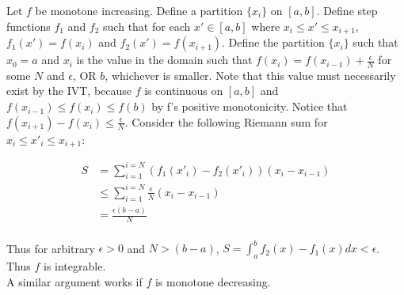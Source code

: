 \documentclass[10pt]{article} %
\begin{document}
Let $f$ be monotone increasing. Define a partition $\{x_i\}$ on $[a,b]$. Define step functions $f_1$ and $f_2$ such that for each $x' \in [a,b]$ where $x_i \leq x' \leq x_{i+1}$, $f_1(x') = f(x_i)$ and $f_2(x') = f(x_{i+1})$. Define the partition $\{x_i\}$ such that $x_0 = a$ and $x_i$ is the value in the domain such that $f(x_i) = f(x_{i-1})+\frac{\epsilon}{N}$ for some $N$ and $\epsilon$, OR $b$, whichever is smaller. Note that this value must necessarily exist by the IVT, because $f$ is continuous on $[a,b]$ and $f(x_{i-1}) \leq f(x_i) \leq f(b)$ by f's positive monotonicity. Notice that $f(x_{i+1}) - f(x_i) \leq \frac{\epsilon}{N}$. Consider the following Riemann sum for $x_i \leq x'_i \leq x_{i+1}$:

\begin{align*}
  S &= \sum_{i=1}^{i=N} \left(f_1(x'_i) - f_2(x'_i)\right)\left(x_i-x_{i-1}\right)\\
  &\leq \sum_{i=1}^{i=N} \frac{\epsilon}{N}\left(x_i-x_{i-1}\right)\\
  &= \frac{\epsilon(b-a)}{N}\\
\end{align*}

Thus for arbitrary $\epsilon>0$ and $N > (b-a)$, $S = \int_a^bf_2(x)-f_1(x)dx < \epsilon$. Thus $f$ is integrable.\\

A similar argument works if $f$ is monotone decreasing.\\
\end{document}
